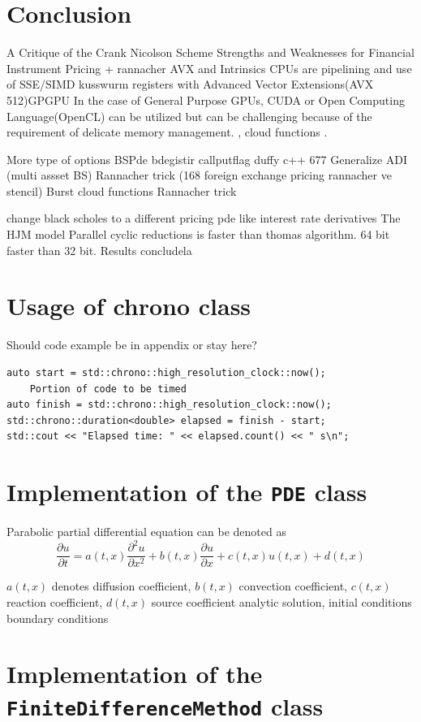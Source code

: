 \documentclass[12pt, oneside]{book}
\theoremstyle{plain}
\theoremstyle{definition}
\begin{document}
\chapter{Conclusion}
A Critique of the Crank Nicolson Scheme Strengths and Weaknesses for Financial Instrument Pricing + rannacher 
AVX and Intrinsics CPUs are pipelining and use of SSE/SIMD kusswurm registers with Advanced Vector Extensions(AVX 512)GPGPU In the case of General Purpose GPUs, CUDA or Open Computing Language(OpenCL) can be utilized but can be challenging because of the requirement of delicate memory management. \cite{fpga},  cloud functions \cite{cloudfunc}.

More type of options BSPde bdegistir callputflag duffy c++ 677 
Generalize ADI (multi assset BS)
Rannacher trick (168 foreign exchange pricing rannacher ve stencil)
Burst cloud functions
Rannacher trick

change black scholes to a different pricing pde like interest rate derivatives The HJM model \cite{kohl}
Parallel cyclic reductions is faster than thomas algorithm. 64 bit faster than 32 bit. 
Results concludela

\appendix
\chapter{Usage of chrono class}
Should code example be in appendix or stay here?
\begin{verbatim}
auto start = std::chrono::high_resolution_clock::now();
    Portion of code to be timed
auto finish = std::chrono::high_resolution_clock::now();
std::chrono::duration<double> elapsed = finish - start;
std::cout << "Elapsed time: " << elapsed.count() << " s\n";
\end{verbatim}

\chapter{Implementation of the {\tt PDE} class}
Parabolic partial differential equation can be denoted as
$$ \frac{\partial u}{\partial t} = a(t,x) \frac{\partial^2 u}{\partial x^2} + b(t,x) \frac{\partial u}{\partial x} + c(t,x) u(t,x) + d(t,x) $$

$a(t,x)$ denotes diffusion coefficient,  $b(t,x)$ convection coefficient, $c(t,x)$ reaction coefficient, $d(t,x)$ source coefficient
analytic solution, initial conditions boundary conditions
\chapter{Implementation of the {\tt FiniteDifferenceMethod} class}
\end{document}

